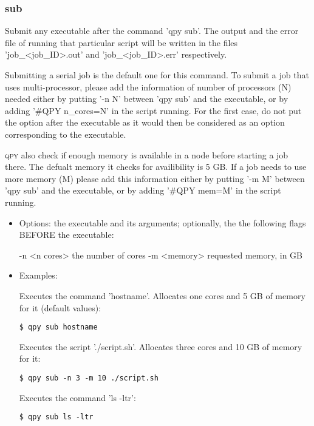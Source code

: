 \documentclass[a4paper,12pt]{article}
\newcommand{\qpy}{\textsc{qpy}}
\begin{document}
\subsubsection{sub}

Submit any executable after the command 'qpy sub'.
The output and the error file of running that particular script will be written in the files 'job\_<job\_ID>.out' and 'job\_<job\_ID>.err' respectively.

Submitting a serial job is the default one for this command.
To submit a job that uses multi-processor, please add the information of number of processors (N) needed either by putting '-n N' between 'qpy sub' and the executable, or by adding '\#QPY n\_cores=N' in the script running.
For the first case, do not put the option after the executable as it would then be considered as an option corresponding to the executable. 

\qpy{} also check if enough memory is available in a node before starting a job there.
The defualt memory it checks for availibility is 5 GB. If a job needs to use more memory (M) please add this information either by putting '-m M' between 'qpy sub' and the executable, or by adding '\#QPY mem=M' in the script running.


\begin{itemize}
\item Options:
  the executable and its arguments;
  optionally, the the following flags BEFORE the executable:

    -n <n cores>        the number of cores
    -m <memory>         requested memory, in GB


\item Examples:

  Executes the command 'hostname'. Allocates one cores and 5 GB of memory for it (default values):

\begin{lstlisting}[style=BashStyle]
$ qpy sub hostname
\end{lstlisting}
  
  Executes the script './script.sh'. Allocates three cores and 10 GB of memory for it:

\begin{lstlisting}[style=BashStyle]
$ qpy sub -n 3 -m 10 ./script.sh 
\end{lstlisting}
  Executes the command 'ls -ltr':

\begin{lstlisting}[style=BashStyle]
$ qpy sub ls -ltr
\end{lstlisting}

\end{itemize}
  
\end{document}
